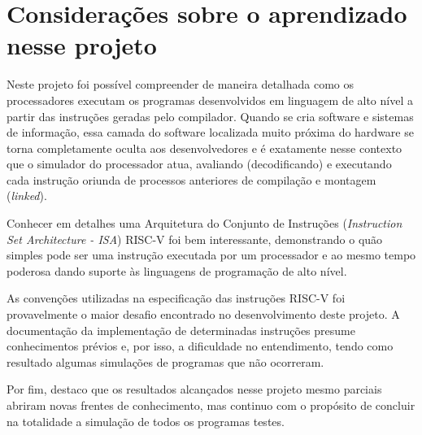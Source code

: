 
\section{Considerações sobre o aprendizado nesse projeto}

Neste projeto foi possível compreender de maneira detalhada como os processadores executam os programas desenvolvidos em linguagem de alto nível a partir das instruções geradas pelo compilador. Quando se cria software e sistemas de informação, essa camada do software localizada muito próxima do hardware se torna completamente oculta aos desenvolvedores e é exatamente nesse contexto que o simulador do processador atua, avaliando (decodificando) e executando cada instrução oriunda de processos anteriores de compilação e montagem (\textit{linked}).

Conhecer em detalhes uma Arquitetura do Conjunto de Instruções (\textit{Instruction Set Architecture - ISA}) RISC-V foi bem interessante, demonstrando o quão simples pode ser uma instrução executada por um processador e ao mesmo tempo poderosa dando suporte às linguagens de programação de alto nível.

As convenções utilizadas na especificação das instruções RISC-V foi provavelmente o maior desafio encontrado no desenvolvimento deste projeto. A documentação da implementação de determinadas instruções presume conhecimentos prévios e, por isso, a dificuldade no entendimento, tendo como resultado algumas simulações de programas que não ocorreram.

Por fim, destaco que os resultados alcançados nesse projeto mesmo parciais abriram novas frentes de conhecimento, mas continuo com o propósito de concluir na totalidade a simulação de todos os programas testes.